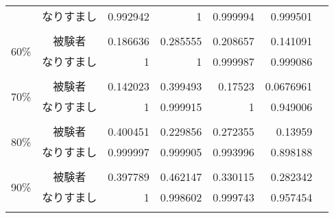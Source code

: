 \begin{center}
\begin{longtable}[btph]{|c|c|r|r|r|r|r|}
           & なりすまし & 0.992942 & 1 & 0.999994 & 0.999501 & \\ \cline{2-7} \\ \hline
      \multirow{2}{*}{60\%} & 被験者 & 0.186636  & 0.285555  & 0.208657  & 0.141091  & \\
           & なりすまし & 1 & 1 & 0.999987 & 0.999086 & \\ \cline{2-7} \\ \hline
      \multirow{2}{*}{70\%} & 被験者 & 0.142023  & 0.399493  & 0.17523   & 0.0676961 & \\
           & なりすまし & 1 & 0.999915 & 1 & 0.949006 & \\ \cline{2-7} \\ \hline
      \multirow{2}{*}{80\%} & 被験者 & 0.400451  & 0.229856  & 0.272355  & 0.13959   & \\
           & なりすまし & 0.999997 & 0.999905 & 0.993996 & 0.898188 & \\ \cline{2-7} \\ \hline
      \multirow{2}{*}{90\%} & 被験者 & 0.397789  & 0.462147  & 0.330115  & 0.282342  & \\
           & なりすまし & 1 & 0.998602 & 0.999743 & 0.957454 & \\ \cline{2-7} \\ \hline \hline
  \end{longtable}
\end{center}
